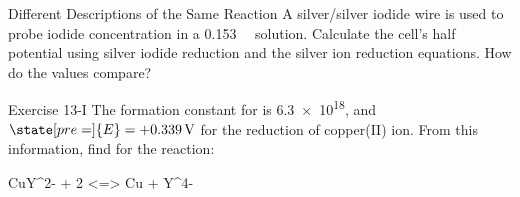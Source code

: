 \documentclass[notes=only]{beamer}
\begin{document}

%

\begin{frame}[t]{Different Descriptions of the Same Reaction}
	A silver/silver iodide wire is used to probe iodide concentration in a
	\SI{0.153}{\milli\Molar}  solution.  Calculate the cell's half
	potential  using silver iodide reduction and the silver ion reduction
	equations.  How do the values compare?

\end{frame}

\clearpage

\begin{frame}[t]{Exercise 13-I}
	The formation constant for  is \num{6.3e18}, and
	$\state[pre=]{E} = \SI[retain-explicit-plus]{+0.339}{\volt}$
	for the reduction of copper(II) ion.  From this information, find
	 for the reaction:
	\begin{reaction*}
		CuY^{2-}  +  2 \el{}  <=>  Cu\sld{}  +  Y^{4-}
	\end{reaction*}

\end{frame}
\end{document}
